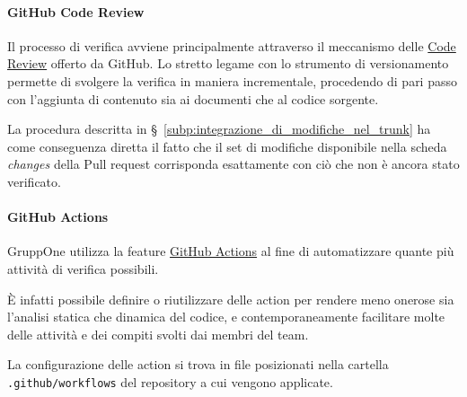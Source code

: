\documentclass[../../norme-di-progetto.tex]{subfiles}
\begin{document}
\paragraph{GitHub Code Review}%
\label{par:code_review}

Il processo di verifica avviene principalmente attraverso il meccanismo delle \href{https://github.com/features/code-review/}{Code Review} offerto da GitHub.
Lo stretto legame con lo strumento di versionamento permette di svolgere la verifica in maniera incrementale, procedendo di pari passo con l'aggiunta di contenuto sia ai documenti che al codice sorgente.

La procedura descritta in §~\ref{subp:integrazione_di_modifiche_nel_trunk} ha come conseguenza diretta il fatto che il set di modifiche disponibile nella scheda \textit{changes} della Pull request corrisponda esattamente con ciò che non è ancora stato verificato.


\paragraph{GitHub Actions}%
\label{par:github_actions}

GruppOne utilizza la feature \href{https://help.github.com/en/actions/automating-your-workflow-with-github-actions/about-github-actions}{GitHub Actions} al fine di automatizzare quante più attività di verifica possibili.

È infatti possibile definire o riutilizzare delle action per rendere meno onerose sia l'analisi statica che dinamica del codice, e contemporaneamente facilitare molte delle attività e dei compiti svolti dai membri del team.

La configurazione delle action si trova in file  posizionati nella cartella \verb|.github/workflows| del repository a cui vengono applicate.


\end{document}
